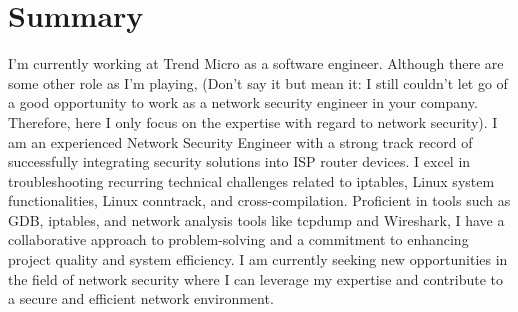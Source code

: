 \section{Summary}
I'm currently working at Trend Micro as a software engineer. Although there are some other role as I'm playing, (Don't say it but mean it: I still couldn't let go of a good opportunity to work as a network security engineer in your company. Therefore, here I only focus on the expertise with regard to network security).
I am an experienced Network Security Engineer with a strong track record of successfully integrating security solutions into ISP router devices. I excel in troubleshooting recurring technical challenges related to iptables, Linux system functionalities, Linux conntrack, and cross-compilation. Proficient in tools such as GDB, iptables, and network analysis tools like tcpdump and Wireshark, I have a collaborative approach to problem-solving and a commitment to enhancing project quality and system efficiency. I am currently seeking new opportunities in the field of network security where I can leverage my expertise and contribute to a secure and efficient network environment.
